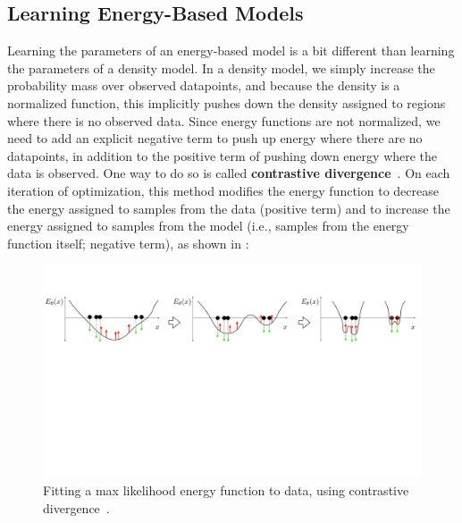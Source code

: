 \subsection{Learning Energy-Based Models}
Learning the parameters of an energy-based model is a bit different than learning the parameters of a density model. In a density model, we simply increase the probability mass over observed datapoints, and because the density is a normalized function, this implicitly pushes down the density assigned to regions where there is no observed data. Since energy functions are not normalized, we need to add an explicit negative term to push up energy where there are no datapoints, in addition to the positive term of pushing down energy where the data is observed. One way to do so is called \textbf{contrastive divergence}~\cite{hinton2002training}. On each iteration of optimization, this method modifies the energy function to decrease the energy assigned to samples from the data (positive term) and to increase the energy assigned to samples from the model (i.e., samples from the energy function itself; negative term), as shown in \fig{\ref{fig:generative_models:contrastive_divergence}}:
\begin{figure}[h]
    \centerline{
    \includegraphics[width=1.0\linewidth]{./figures/generative_models/contrastive_divergence.pdf}
    }
    \caption{Fitting a max likelihood energy function to data, using contrastive divergence~\cite{hinton2002training}.}
    \label{fig:generative_models:contrastive_divergence}
\end{figure}

